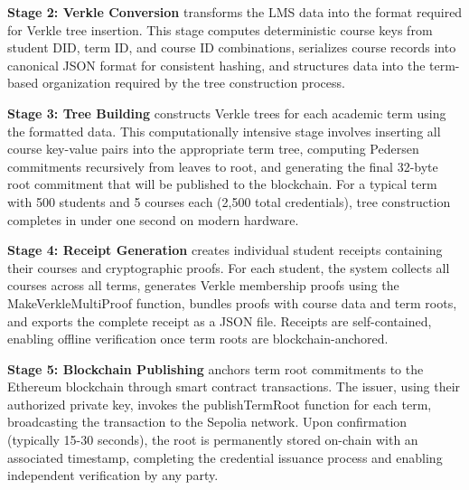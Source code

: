 \textbf{Stage 2: Verkle Conversion} transforms the LMS data into the format required for Verkle tree insertion. This stage computes deterministic course keys from student DID, term ID, and course ID combinations, serializes course records into canonical JSON format for consistent hashing, and structures data into the term-based organization required by the tree construction process.

\textbf{Stage 3: Tree Building} constructs Verkle trees for each academic term using the formatted data. This computationally intensive stage involves inserting all course key-value pairs into the appropriate term tree, computing Pedersen commitments recursively from leaves to root, and generating the final 32-byte root commitment that will be published to the blockchain. For a typical term with 500 students and 5 courses each (2,500 total credentials), tree construction completes in under one second on modern hardware.

\textbf{Stage 4: Receipt Generation} creates individual student receipts containing their courses and cryptographic proofs. For each student, the system collects all courses across all terms, generates Verkle membership proofs using the MakeVerkleMultiProof function, bundles proofs with course data and term roots, and exports the complete receipt as a JSON file. Receipts are self-contained, enabling offline verification once term roots are blockchain-anchored.

\textbf{Stage 5: Blockchain Publishing} anchors term root commitments to the Ethereum blockchain through smart contract transactions. The issuer, using their authorized private key, invokes the publishTermRoot function for each term, broadcasting the transaction to the Sepolia network. Upon confirmation (typically 15-30 seconds), the root is permanently stored on-chain with an associated timestamp, completing the credential issuance process and enabling independent verification by any party.